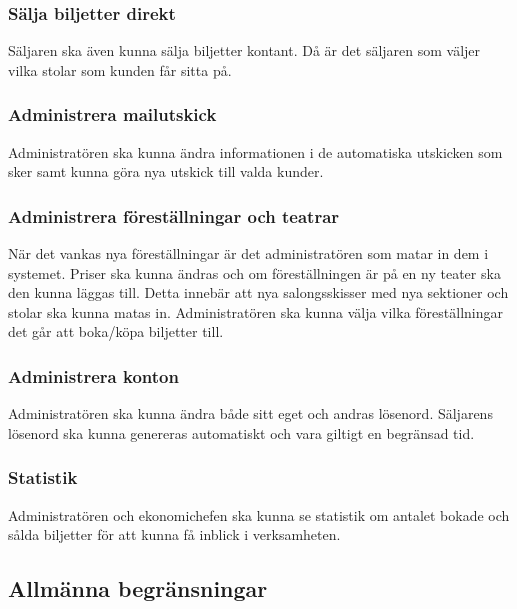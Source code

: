 \documentclass[a4paper, twoside, 11pt, titlepage]{article}
\begin{document}
	\subsubsection{Sälja biljetter direkt}


		Säljaren ska även kunna sälja biljetter kontant. Då är det säljaren som väljer vilka stolar som kunden får sitta på.

	\subsubsection{Administrera mailutskick}


		Administratören ska kunna ändra informationen i de automatiska utskicken som sker samt kunna göra nya utskick till valda kunder.

	\subsubsection{Administrera föreställningar och teatrar}


		När det vankas nya föreställningar är det administratören som matar in dem i systemet. Priser ska kunna ändras och om föreställningen är på en ny teater ska den kunna läggas till. Detta innebär att nya salongsskisser med nya sektioner och stolar ska kunna matas in. Administratören ska kunna välja vilka föreställningar det går att boka/köpa biljetter till.

	\subsubsection{Administrera konton}


		Administratören ska kunna ändra både sitt eget och andras lösenord. Säljarens lösenord ska kunna genereras automatiskt och vara giltigt en begränsad tid.

	\subsubsection{Statistik}


		Administratören och ekonomichefen ska kunna se statistik om antalet bokade och sålda biljetter för att kunna få inblick i verksamheten.

	\subsection{Allmänna begränsningar}
\end{document}
